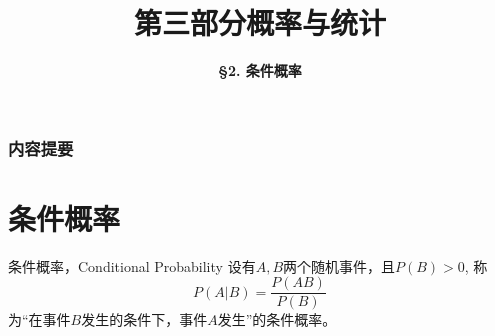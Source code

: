 



\title[Probability \& Statistics]{\LARGE \bfseries 第三部分\quad 概率与统计} %
\author[Conditional Probability] %
{\Large \bfseries \S 2. 条件概率}
\date{}






\begin{frame}

\titlepage %

\end{frame}


\begin{frame}
\frametitle{内容提要} %
\tableofcontents %
\end{frame}


\section{条件概率}


\begin{frame}

\begin{block}{条件概率，Conditional Probability}
设有$A,B$两个随机事件，且$P(B) > 0$, 称
\[P(A|B) = \dfrac{P(AB)}{P(B)}\]
为``在事件$B$发生的条件下，事件$A$发生''的条件概率。
\end{block}

\end{frame}

